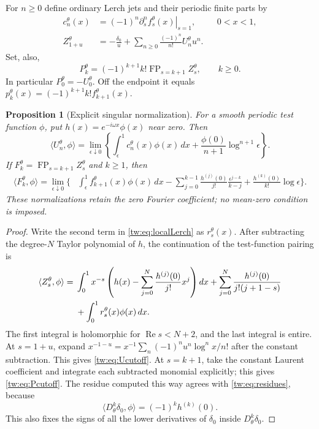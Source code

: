 \documentclass[11pt,letterpaper]{article}
\numberwithin{equation}{section}
\theoremstyle{plain}
\newtheorem{proposition}[theorem]{Proposition}
\theoremstyle{definition}
\theoremstyle{remark}
\begin{document}
For $n\ge0$ define ordinary Lerch jets and their periodic finite parts
by
\begin{align}
 c_n^\theta(x)&=(-1)^n
          \left.\partial_s^n f_s^\theta(x)\right|_{s=1},
               &&0<x<1,\label{tw:eq:ordinaryjets}\\
 Z_{1+u}^\theta&=-\frac{\delta_0}{u}
       +\sum_{n\ge0}\frac{(-1)^n}{n!}U_n^\theta u^n.
 \label{tw:eq:jets}
\end{align}
Set, also,
\begin{equation}\label{tw:eq:Pk}
 P_k^\theta=(-1)^{k+1}k!
               \operatorname{FP}_{s=k+1}Z_s^\theta,
 \qquad k\ge0.
\end{equation}
In particular $P_0^\theta=-U_0^\theta$. Off the endpoint it equals
$p_k^\theta(x)=(-1)^{k+1}k! f_{k+1}^\theta(x)$.

\begin{proposition}[Explicit singular normalization]
\label{tw:prop:cutoff}
For a smooth periodic test function $\phi$, put
$h(x)=e^{-i\omega x}\phi(x)$ near zero. Then
\begin{equation}\label{tw:eq:Ucutoff}
 \langle U_n^\theta,\phi\rangle
 =\lim_{\epsilon\downarrow0}\left\{
      \int_\epsilon^1 c_n^\theta(x)\phi(x)\,dx
        +\frac{\phi(0)}{n+1}\log^{n+1}\epsilon\right\}.
\end{equation}
If $F_k^\theta=\operatorname{FP}_{s=k+1}Z_s^\theta$ and $k\ge1$,
then
\begin{align}
 \langle F_k^\theta,\phi\rangle
 =\lim_{\epsilon\downarrow0}\biggl\{&
       \int_\epsilon^1 f_{k+1}^\theta(x)\phi(x)\,dx
       -\sum_{j=0}^{k-1}\frac{h^{(j)}(0)}{j!}
                         \frac{\epsilon^{j-k}}{k-j}
       +\frac{h^{(k)}(0)}{k!}\log\epsilon\biggr\}.
 \label{tw:eq:Pcutoff}
\end{align}
These normalizations retain the zero Fourier coefficient; no
mean-zero condition is imposed.
\end{proposition}

\begin{proof}
Write the second term in \eqref{tw:eq:localLerch} as
$r_s^\theta(x)$. After subtracting the degree-$N$ Taylor polynomial
of $h$, the continuation of the test-function pairing is
\begin{align}
 \langle Z_s^\theta,\phi\rangle={}&
 \int_0^1x^{-s}\left(h(x)-\sum_{j=0}^N
                     \frac{h^{(j)}(0)}{j!}x^j\right)dx
 +\sum_{j=0}^N\frac{h^{(j)}(0)}{j!(j+1-s)}\notag\\
 &+\int_0^1r_s^\theta(x)\phi(x)\,dx.
 \label{tw:eq:testsubtraction}
\end{align}
The first integral is holomorphic for $\operatorname{Re}s<N+2$,
and the last integral is entire. At $s=1+u$, expand
$x^{-1-u}=x^{-1}\sum_n(-1)^n u^n\log^n x/n!$ after the constant
subtraction. This gives \eqref{tw:eq:Ucutoff}. At $s=k+1$, take
the constant Laurent coefficient and integrate each subtracted
monomial explicitly; this gives \eqref{tw:eq:Pcutoff}.
The residue computed this way agrees with \eqref{tw:eq:residues},
because
\[
 \langle D_\theta^k\delta_0,\phi\rangle
       =(-1)^k h^{(k)}(0).
\]
This also fixes the signs of all the lower derivatives of $\delta_0$
inside $D_\theta^k\delta_0$.
\end{proof}
\end{document}
